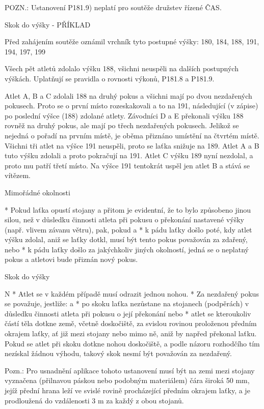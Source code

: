 POZN.: Ustanovení P181.9) neplatí pro soutěže družstev řízené ČAS.

Skok do výšky - PŘÍKLAD

Před  zahájením  soutěže  oznámil  vrchník  tyto postupné výšky: 180, 184, 188, 191, 194, 197, 199

Všech pět atletů zdolalo výšku 188, všichni neuspěli na dalších postupných výškách. Uplatňují se pravidla o rovnosti výkonů, P181.8 a P181.9.

Atlet A, B a C zdolali 188 na druhý pokus a všichni mají po dvou nezdařených pokusech. Proto se o první místo rozeskakovali a to na 191, následující (v zápise) po poslední výšce (188) zdolané atlety. Závodníci D a E překonali výšku 188 rovněž na druhý pokus, ale mají po třech nezdařených pokusech. Jelikož se nejedná o pořadí na prvním místě, je oběma přiznáno umístění na čtvrtém místě. Všichni tři atlet na výšce 191 neuspěli, proto se laťka snižuje na 189. Atlet A a B tuto výšku zdolali a proto pokračují na 191. Atlet C výšku 189 nyní nezdolal, a proto mu patří třetí místo.  Na výšce 191 tentokrát uspěl jen atlet B a stává se vítězem.

Mimořádné okolnosti

* Pokud laťka opustí stojany a přitom je evidentní, že to bylo způsobeno jinou silou, než v důsledku činnosti atleta při pokusu o překonání nastavené výšky (např. vlivem závanu větru), pak, pokud
  \begitems \style a
  * k pádu laťky došlo poté, kdy atlet výšku zdolal, aniž se laťky dotkl, musí být tento pokus považován za zdařený, nebo
  * k pádu laťky došlo za jakýchkoliv jiných okolností, jedná se o neplatný pokus a atletovi bude přiznán nový pokus.
  \enditems
\enditems

\secc Skok do výšky

\begitems \style N
* Atlet se v každém případě musí odrazit jednou nohou.
* Za nezdařený pokus se považuje, jestliže:
  \begitems \style a
  * po skoku laťka nezůstane na stojanech (podpěrách) v důsledku činnosti atleta při pokusu o její překonání nebo
  * atlet se kteroukoliv částí těla dotkne země, včetně doskočiště, za svislou rovinou proloženou předním okrajem laťky, ať již mezi stojany nebo mimo ně, aniž by napřed překonal laťku. Pokud se atlet při skoku dotkne nohou doskočiště, a podle názoru rozhodčího tím nezískal žádnou výhodu, takový skok nesmí být považován za nezdařený.

  Pozn.: Pro usnadnění aplikace tohoto ustanovení musí být na zemi mezi stojany vyznačena (přilnavou páskou nebo podobným materiálem) čára široká 50 mm, jejíž přední hrana leží ve svislé rovině procházející předním okrajem laťky, a je prodloužená do vzdálenosti 3 m za každý z obou stojanů.

